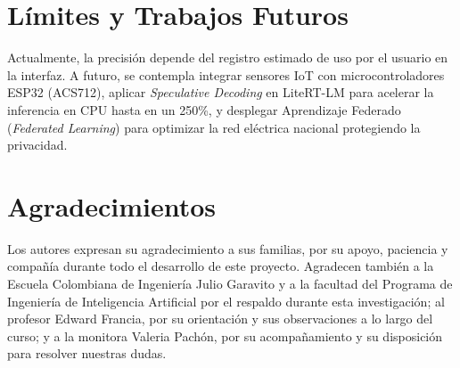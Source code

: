 \documentclass[10pt,journal,compsoc]{IEEEtran}
\begin{document}
\section{Límites y Trabajos Futuros}
Actualmente, la precisión depende del registro estimado de uso por el usuario en la interfaz. A futuro, se contempla integrar sensores IoT con microcontroladores ESP32 (ACS712), aplicar \emph{Speculative Decoding} en LiteRT-LM para acelerar la inferencia en CPU hasta en un 250\%, y desplegar Aprendizaje Federado (\emph{Federated Learning}) para optimizar la red eléctrica nacional protegiendo la privacidad.

\section*{Agradecimientos}
Los autores expresan su agradecimiento a sus familias, por su apoyo, paciencia y compañía durante todo el desarrollo de este proyecto. Agradecen también a la Escuela Colombiana de Ingeniería Julio Garavito y a la facultad del Programa de Ingeniería de Inteligencia Artificial por el respaldo durante esta investigación; al profesor Edward Francia, por su orientación y sus observaciones a lo largo del curso; y a la monitora Valeria Pachón, por su acompañamiento y su disposición para resolver nuestras dudas.
\end{document}
